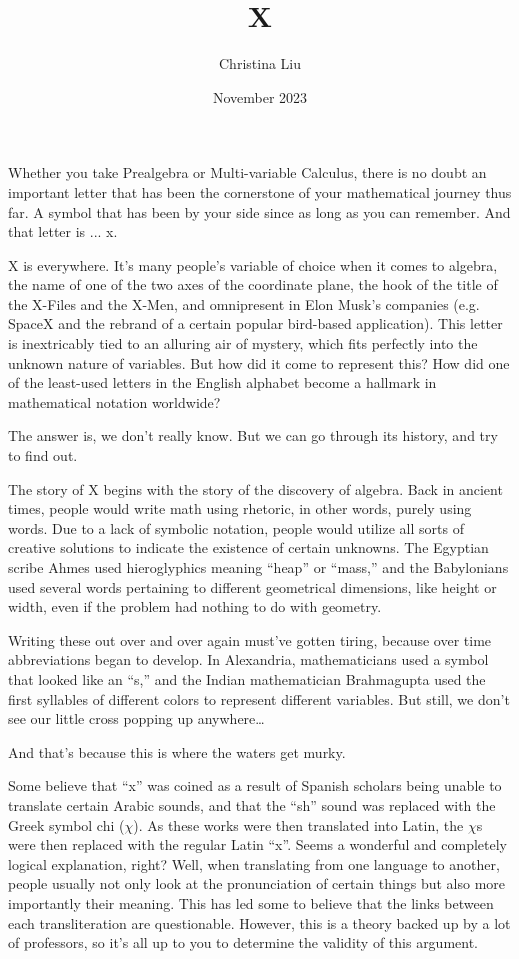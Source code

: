 \documentclass{article}
\title{X}
\author{Christina Liu}
\date{November 2023}
\begin{document}
\maketitle
Whether you take Prealgebra or Multi-variable Calculus, there is no doubt an important letter that has been the cornerstone of your mathematical journey thus far. A symbol that has been by your side since as long as you can remember. And that letter is ... x.

X is everywhere. It’s many people’s variable of choice when it comes to algebra, the name of one of the two axes of the coordinate plane, the hook of the title of the X-Files and the X-Men, and omnipresent in Elon Musk’s companies (e.g. SpaceX and the rebrand of a certain popular bird-based application). This letter is inextricably tied to an alluring air of mystery, which fits perfectly into the unknown nature of variables. But how did it come to represent this? How did one of the least-used letters in the English alphabet become a hallmark in mathematical notation worldwide?

The answer is, we don’t really know. But we can go through its history, and try to find out.

The story of X begins with the story of the discovery of algebra. Back in ancient times, people would write math using rhetoric, in other words, purely using words. Due to a lack of symbolic notation, people would utilize all sorts of creative solutions to indicate the existence of certain unknowns. The Egyptian scribe Ahmes used hieroglyphics meaning ``heap'' or ``mass,'' and the Babylonians used several words pertaining to different geometrical dimensions, like height or width, even if the problem had nothing to do with geometry.

Writing these out over and over again must’ve gotten tiring, because over time abbreviations began to develop. In Alexandria, mathematicians used a symbol that looked like an ``s,'' and the Indian mathematician Brahmagupta used the first syllables of different colors to represent different variables. But still, we don’t see our little cross popping up anywhere…

And that’s because this is where the waters get murky.

Some believe that ``x'' was coined as a result of Spanish scholars being unable to translate certain Arabic sounds, and that the ``sh'' sound was replaced with the Greek symbol chi ($\chi$). As these works were then translated into Latin, the $\chi$s were then replaced with the regular Latin ``x''. Seems a wonderful and completely logical explanation, right? Well, when translating from one language to another, people usually not only look at the pronunciation of certain things but also more importantly their meaning. This has led some to believe that the links between each transliteration are questionable. However, this is a theory backed up by a lot of professors, so it’s all up to you to determine the validity of this argument.
\end{document}
